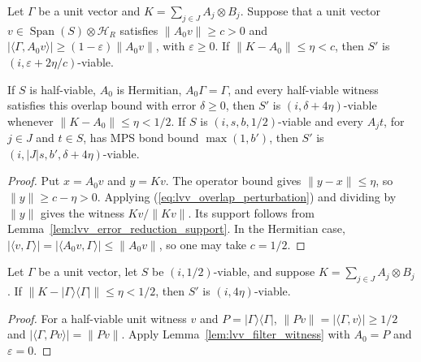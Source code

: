 \begin{lemma}
    \label{lem:lvv_filter_witness}
    \leanok
    Let $\Gamma$ be a unit vector and
    $K=\sum_{j\in J}A_j\otimes B_j$. Suppose that a unit vector
    $v\in\operatorname{Span}(S)\otimes\mathcal H_R$ satisfies
    $\|A_0v\|\ge c>0$ and
    $|\langle\Gamma,A_0v\rangle|\ge(1-\varepsilon)\|A_0v\|$, with
    $\varepsilon\ge0$. If $\|K-A_0\|\le\eta<c$, then $S'$ is
    $(i,\varepsilon+2\eta/c)$-viable.

    If $S$ is half-viable, $A_0$ is Hermitian, $A_0\Gamma=\Gamma$, and
    every half-viable witness satisfies this overlap bound with error
    $\delta\ge0$, then $S'$ is $(i,\delta+4\eta)$-viable whenever
    $\|K-A_0\|\le\eta<1/2$. If $S$ is $(i,s,b,1/2)$-viable and every $A_jt$, for
    $j\in J$ and $t\in S$, has MPS bond bound $\max(1,b')$, then $S'$ is
    $(i,|J|s,b',\delta+4\eta)$-viable.
\end{lemma}
\begin{proof}
    \leanok
    Put $x=A_0v$ and $y=Kv$. The operator bound gives $\|y-x\|\le\eta$,
    so $\|y\|\ge c-\eta>0$. Applying
    (\ref{eq:lvv_overlap_perturbation}) and dividing by $\|y\|$ gives the
    witness $Kv/\|Kv\|$. Its support follows from
    Lemma~\ref{lem:lvv_error_reduction_support}. In the Hermitian case,
    $|\langle v,\Gamma\rangle|=|\langle A_0v,\Gamma\rangle|
        \le\|A_0v\|$, so one may take $c=1/2$.
\end{proof}

\begin{lemma}
    \label{lem:lvv_projection_error_reduction}
    \leanok
    Let $\Gamma$ be a unit vector, let $S$ be $(i,1/2)$-viable, and suppose
    $K=\sum_{j\in J}A_j\otimes B_j$. If
    $\|K-|\Gamma\rangle\langle\Gamma|\|\le\eta<1/2$, then $S'$ is
    $(i,4\eta)$-viable.
\end{lemma}
\begin{proof}
    \leanok
    For a half-viable unit witness $v$ and
    $P=|\Gamma\rangle\langle\Gamma|$,
    $\|Pv\|=|\langle\Gamma,v\rangle|\ge1/2$ and
    $|\langle\Gamma,Pv\rangle|=\|Pv\|$. Apply
    Lemma~\ref{lem:lvv_filter_witness} with $A_0=P$ and $\varepsilon=0$.
\end{proof}


